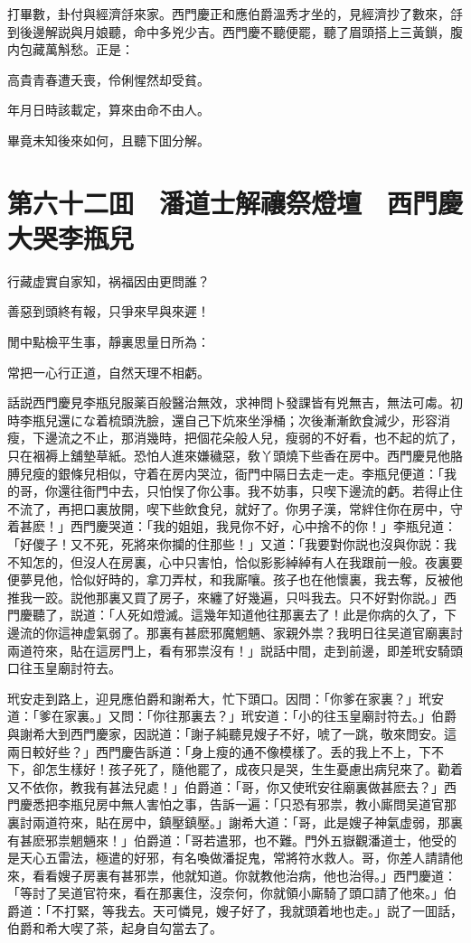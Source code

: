 打畢數，卦付與經濟㧱來家。西門慶正和應伯爵溫秀才坐的，見經濟抄了數來，㧱到後邊解説與月娘聽，命中多兇少吉。西門慶不聽便罷，聽了眉頭搭上三黃鎖，腹内包藏萬斛愁。正是：

高貴青春遭夭喪，伶俐惺然却受貧。

年月日時該載定，算來由命不由人。

畢竟未知後來如何，且聽下囬分解。

\chapter*{第六十二囬　潘道士解禳祭燈壇　西門慶大哭李瓶兒}

行藏虚實自家知，祸福因由更問誰？

善惡到頭終有報，只爭來早與來遲！

閒中點檢平生事，靜裏思量日所為：

常把一心行正道，自然天理不相虧。

話説西門慶見李瓶兒服薬百般醫治無效，求神問卜發課皆有兇無吉，無法可䖏。初時李瓶兒還にな着梳頭洗臉，還自己下炕來坐淨桶；次後漸漸飲食減少，形容消瘦，下邊流之不止，那消幾時，把個花朵般人兒，瘦弱的不好看，也不起的炕了，只在裀褥上舖墊草紙。恐怕人進來嫌穢惡，敎丫頭燒下些香在房中。西門慶見他胳膊兒瘦的銀條兒相似，守着在房内哭泣，衙門中隔日去走一走。李瓶兒便道：「我的哥，你還往衙門中去，只怕悮了你公事。我不妨事，只喫下邊流的虧。若得止住不流了，再把口裏放開，喫下些飲食兒，就好了。你男子漢，常絆住你在房中，守着甚麽！」西門慶哭道：「我的姐姐，我見你不好，心中捨不的你！」李瓶兒道：「好儍子！又不死，死將來你攔的住那些！」又道：「我要對你説也沒與你説：我不知怎的，但沒人在房裏，心中只害怕，恰似影影綽綽有人在我跟前一般。夜裏要便夢見他，恰似好時的，拿刀弄杖，和我廝嚷。孩子也在他懷裏，我去奪，反被他推我一跤。説他那裏又買了房子，來纏了好幾遍，只呌我去。只不好對你説。」西門慶聽了，説道：「人死如燈滅。這幾年知道他往那裏去了！此是你病的久了，下邊流的你這神虚氣弱了。那裏有甚麽邪魔魍魎、家親外祟？我明日往吴道官廟裏討兩道符來，貼在這房門上，看有邪祟沒有！」説話中間，走到前邊，即差玳安騎頭口往玉皇廟討符去。

玳安走到路上，迎見應伯爵和謝希大，忙下頭口。因問：「你爹在家裏？」玳安道：「爹在家裏。」又問：「你往那裏去？」玳安道：「小的往玉皇廟討符去。」伯爵與謝希大到西門慶家，因説道：「謝子純聽見嫂子不好，唬了一跳，敬來問安。這兩日較好些？」西門慶告訴道：「身上瘦的通不像模樣了。丢的我上不上，下不下，卻怎生樣好！孩子死了，隨他罷了，成夜只是哭，生生憂慮出病兒來了。勸着又不依你，教我有甚法兒處！」伯爵道：「哥，你又使玳安往廟裏做甚麽去？」西門慶悉把李瓶兒房中無人害怕之事，告訴一遍：「只恐有邪祟，教小廝問吴道官那裏討兩道符來，貼在房中，鎮壓鎮壓。」謝希大道：「哥，此是嫂子神氣虚弱，那裏有甚麽邪祟魍魎來！」伯爵道：「哥若遣邪，也不難。門外五嶽觀潘道士，他受的是天心五雷法，極遣的好邪，有名喚做潘捉鬼，常將符水救人。哥，你差人請請他來，看看嫂子房裏有甚邪祟，他就知道。你就教他治病，他也治得。」西門慶道：「等討了吴道官符來，看在那裏住，沒奈何，你就領小廝騎了頭口請了他來。」伯爵道：「不打緊，等我去。天可憐見，嫂子好了，我就頭着地也走。」説了一囬話，伯爵和希大喫了茶，起身自勾當去了。

